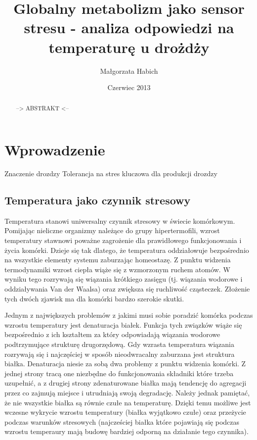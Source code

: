 \documentclass{pracamgr}
\author{Małgorzata Habich}
\title{Globalny metabolizm jako sensor stresu - analiza odpowiedzi na temperaturę u drożdży}
\date{Czerwiec 2013}
\begin{document}
\maketitle

\begin{abstract}
--> ABSTRAKT <--
\end{abstract}

\tableofcontents

\chapter{Wprowadzenie}

Znaczenie drozdzy \cite{100years}
Tolerancja na stres kluczowa dla produkcji drozdzy \cite{Stresstolerance}


\section{Temperatura jako czynnik stresowy}

Temperatura stanowi uniwersalny czynnik stresowy w świecie komórkowym. Pomijając nieliczne organizmy należące do grupy hipertermofili, wzrost temperatury stawnowi poważne zagrożenie
dla prawidłowego funkcjonowania i życia komórki. Dzieje się tak dlatego, że temperatura oddziałowuje bezpośrednio na wszystkie elementy systemu zaburzając homeostazę. 
Z punktu widzenia termodynamiki wzrost ciepła wiąże się z wzmorzonym ruchem atomów. W wyniku tego rozrywają się wiązania krótkiego zasięgu (tj. wiązania wodorowe i oddziaływania Van der Waalsa) oraz 
zwiększa się ruchliwość cząsteczek. Złożenie tych dwóch zjawisk ma dla komórki bardzo szerokie skutki.

Jednym z największych problemów z jakimi musi sobie poradzić komórka podczas wzrostu temperatury jest denaturacja białek. Funkcja tych związków wiąże się bezpośrednio z ich kształtem za który odpowiadają 
wiązania wodorowe podtrzymujące strukturę drugorzędową. Gdy wzrasta temperatura wiązania rozrywają się i najczęściej w sposób nieodwracalny zaburzana jest struktura białka. Denaturacja niesie za sobą
dwa problemy z punktu widzenia komórki. Z jednej strony tracą one niezbędne do funkcjonowania składniki które trzeba uzupełnić, a z drugiej strony zdenaturowane białka mają tendencję
do agregacji przez co zajmują miejsce i utrudniają swoją degradację. Należy jednak pamiętać, że nie wszystkie białka są równie czułe na temperaturę. Dzięki temu możliwe jest wczesne wykrycie wzrostu temperatury (białka
wyjątkowo czułe) oraz przeżycie podczas warunków stresowych (najcześciej białka które pojawiają się podczas wzrostu temperaury mają budowę bardziej odporną na działanie tego czynnika)\cite{}.
\end{document}
